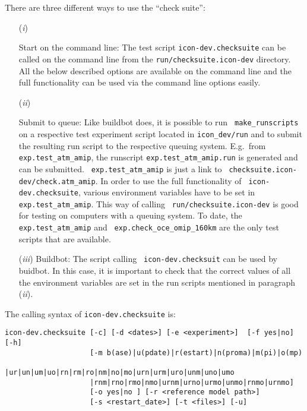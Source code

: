 There are three different ways to use the ``check suite'':
\begin{itemize}
\item[({\it i}\/)] \begin{sloppypar} 
Start on the command line: The test script {\tt icon-dev.checksuite}
can be called on 
the command line from the {\tt run/checksuite.icon-dev} directory. All
the below described options are available on the command line and the
full functionality can be used via the command line options easily.
\end{sloppypar} 
\item[({\it ii}\/)] \begin{sloppypar} 
    Submit to queue: Like buildbot does, it is possible to run {\tt
    make\_runscripts} on a respective test experiment script located
  in {\tt icon\_dev/run} and to submit the resulting run script to the
  respective queuing system. E.g.~from 
  {\tt exp.test\_atm\_amip}, the runscript
  {\tt exp.test\_atm\_amip.run} is generated and can be submitted. {\tt
    exp.test\_atm\_amip} is just a link to {\tt
    checksuite.icon-dev/check.atm\_amip}. In order to use
  the full functionality of {\tt 
    icon-dev.checksuite}, various environment variables have to be set
  in {\tt exp.test\_atm\_amip}. This way of calling {\tt
    run/checksuite.icon-dev} is good for testing on computers with a
  queuing system. To date, the {\tt exp.test\_atm\_amip} and {\tt
    exp.check\_oce\_omip\_160km} are the only test scripts that are
  available. \end{sloppypar}
\item[({\it iii}\/)] Buildbot: The script calling {\tt
    icon-dev.checksuit} can be 
  used by buidbot. In this case, it is important to check that the
  correct values of all the environment variables are set in the run
  scripts mentioned in paragraph ({\it ii}\/).
\end{itemize}

The calling syntax of {\tt icon-dev.checksuite} is:

\begin{Verbatim}[frame=single]
icon-dev.checksuite [-c] [-d <dates>] [-e <experiment>]  [-f yes|no] [-h] 
                    [-m b(ase)|u(pdate)|r(estart)|n(proma)|m(pi)|o(mp)
                    |ur|un|um|uo|rn|rm|ro|nm|no|mo|urn|urm|uro|unm|uno|umo
                    |rnm|rno|rmo|nmo|urnm|urno|urmo|unmo|rnmo|urnmo]
                    [-o yes|no ] [-r <reference model path>] 
                    [-s <restart_date>] [-t <files>] [-u]
\end{Verbatim}

